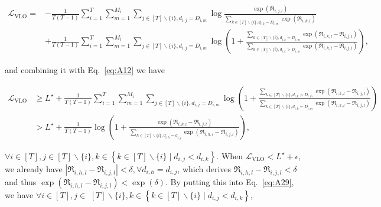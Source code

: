 \begin{equation}\label{eq:A29}
\begin{aligned}
\mathcal{L}_{\mathrm{VLO}}= & -\frac{1}{T(T-1)} \sum_{i=1}^{T} \sum_{m=1}^{M_i} \sum_{j \in[T] \backslash\{i\}, d_{i, j}=D_{i, m}} \log \frac{\exp \left(\mathfrak{R}_{i, j,l}\right)}{\sum\limits_{k \in[T] \backslash\{i\}, d_{i, k}=D_{i, m}} \exp \left(\mathfrak{R}_{i, k,l}\right)} \\
& +\frac{1}{T(T-1)} \sum_{i=1}^{T} \sum_{m=1}^{M_i} \sum_{j \in[T] \backslash\{i\}, d_{i, j}=D_{i, m}} \log \left(1+\frac{\sum\limits_{k \in[T] \backslash\{i\}, d_{i, k}=D_{i, m}} \exp \left(\mathfrak{R}_{i, k,l}-\mathfrak{R}_{i, j,l}\right)}{\sum\limits_{k \in[T] \backslash \{i\}, d_{i, k}>D_{i, m}} \exp \left(\mathfrak{R}_{i, k,l}-\mathfrak{R}_{i, j,l}\right)}\right),
\end{aligned}
\end{equation}

and combining it with Eq.~\eqref{eq:A12} we have

\begin{equation}\label{eq:A30}
\begin{aligned}
\mathcal{L}_{\mathrm{VLO}} & \geq L^{\star}+\frac{1}{T(T-1)} \sum_{i=1}^{T} \sum_{m=1}^{M_i} \sum_{j \in[T] \backslash\{i\}, d_{i, j}=D_{i, m}} \log \left(1+\frac{\sum\limits_{k \in[T] \backslash\{i\}, d_{i, k}>D_{i, m}} \exp \left(\mathfrak{R}_{i, k,l}-\mathfrak{R}_{i, j,l}\right)}{\sum\limits_{k \in[T] \backslash\{i\}, d_{i, k}=D_{i, m}} \exp \left(\mathfrak{R}_{i, k,l}-\mathfrak{R}_{i, j,l}\right)}\right) \\
& >L^{\star}+\frac{1}{T(T-1)} \log \left(1+\frac{\exp \left(\mathfrak{R}_{i, k,l}-\mathfrak{R}_{i, j,l}\right)}{\sum\limits_{h \in[T] \backslash\{i\}, d_{i, h}=d_{i, j}} \exp \left(\mathfrak{R}_{i, h,l}-\mathfrak{R}_{i, j,l}\right)}\right),
\end{aligned}
\end{equation}



$\forall i \in[T], j \in[T] \backslash\{i\}, k \in\left\{k \in[T] \backslash\{i\} \mid d_{i, j}<d_{i, k}\right\}$.
When $\mathcal{L}_{\mathrm{VLO}}<L^{\star}+\epsilon$, we already have $\left|\mathfrak{R}_{i, h,l}-\mathfrak{R}_{i, j,l}\right|<\delta, \forall d_{i, h}=d_{i, j}$, which derives $\mathfrak{R}_{i,h, l}-\mathfrak{R}_{i, j,l}<\delta$ and thus $\exp \left(\mathfrak{R}_{i,h, l}-\mathfrak{R}_{i, j,l}\right)<\exp (\delta)$. By putting this into Eq.~\eqref{eq:A29}, we have $\forall i \in[T], j \in$ $[T] \backslash\{i\}, k \in\left\{k \in[T] \backslash\{i\} \mid d_{i, j}<d_{i, k}\right\}$,

